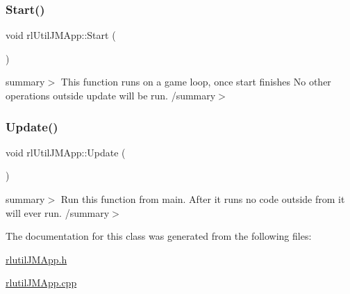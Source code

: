 \mbox{\label{classrl_util_j_m_app_afeeb2c2481b03b070958827c16f90ebe}} 
\subsubsection{\texorpdfstring{Start()}{Start()}}
{\footnotesize\ttfamily void rl\+Util\+J\+M\+App\+::\+Start (\begin{DoxyParamCaption}{ }\end{DoxyParamCaption})\hspace{0.3cm}{\ttfamily [virtual]}}

summary$>$ This function runs on a game loop, once start finishes No other operations outside update will be run. /summary$>$ \mbox{\label{classrl_util_j_m_app_ab2d1c8458f70c9846f7e47804e433491}} 
\subsubsection{\texorpdfstring{Update()}{Update()}}
{\footnotesize\ttfamily void rl\+Util\+J\+M\+App\+::\+Update (\begin{DoxyParamCaption}{ }\end{DoxyParamCaption})\hspace{0.3cm}{\ttfamily [virtual]}}

summary$>$ Run this function from main. After it runs no code outside from it will ever run. /summary$>$ 

The documentation for this class was generated from the following files\+:\begin{DoxyCompactItemize}
\item 
\hyperlink{rlutil_j_m_app_8h}{rlutil\+J\+M\+App.\+h}\item 
\hyperlink{rlutil_j_m_app_8cpp}{rlutil\+J\+M\+App.\+cpp}\end{DoxyCompactItemize}
